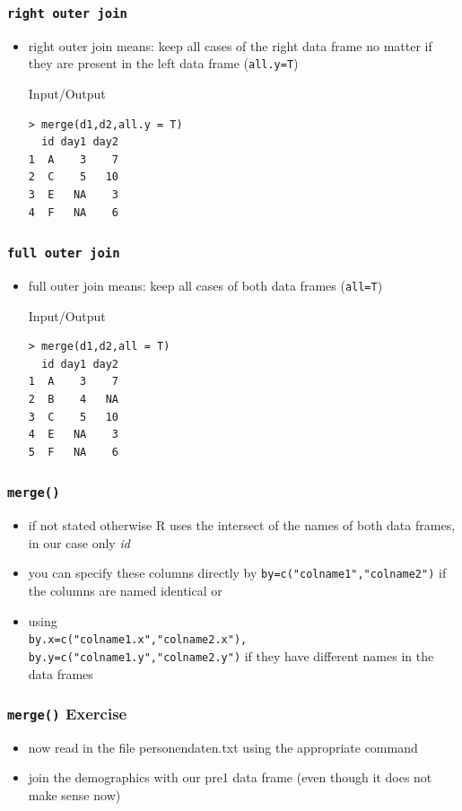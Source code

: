 \documentclass[xcolor={table},c]{beamer}
\begin{document}
\begin{frame}[fragile]\frametitle{\texttt{right outer join}}
\begin{itemize}
\item right outer join means: keep all cases of the right data frame no matter if they are present in the left data frame (\texttt{all.y=T})
  \begin{exampleblock}{Input/Output}\small
\begin{verbatim}
> merge(d1,d2,all.y = T)
  id day1 day2
1  A    3    7
2  C    5   10
3  E   NA    3
4  F   NA    6
\end{verbatim}
  \end{exampleblock}
\end{itemize}
\end{frame}


\begin{frame}[fragile]\frametitle{\texttt{full outer join}}
\begin{itemize}
\item full outer join means: keep all cases of both data frames (\texttt{all=T})
  \begin{exampleblock}{Input/Output}\small
\begin{verbatim}
> merge(d1,d2,all = T)
  id day1 day2
1  A    3    7
2  B    4   NA
3  C    5   10
4  E   NA    3
5  F   NA    6
\end{verbatim}
  \end{exampleblock}
\end{itemize}
\end{frame}

\begin{frame}[fragile]\frametitle{\texttt{merge()}}
\begin{itemize}
\item if not stated otherwise R uses the intersect of the names of both data frames, in our case only \textit{id}
\item you can specify these columns directly by \texttt{by=c("colname1","colname2")} if the columns are named identical or
\item using\\ \texttt{by.x=c("colname1.x","colname2.x"),
by.y=c("colname1.y","colname2.y")} if they have different names in the data frames
\end{itemize}
\end{frame}


\begin{frame}[fragile]\frametitle{\texttt{merge()} Exercise}
\begin{itemize}
\item now read in the file personendaten.txt using the appropriate command
\item join the demographics with our pre1 data frame (even though it does not make sense now)
\end{itemize}
\end{frame}
\end{document}
